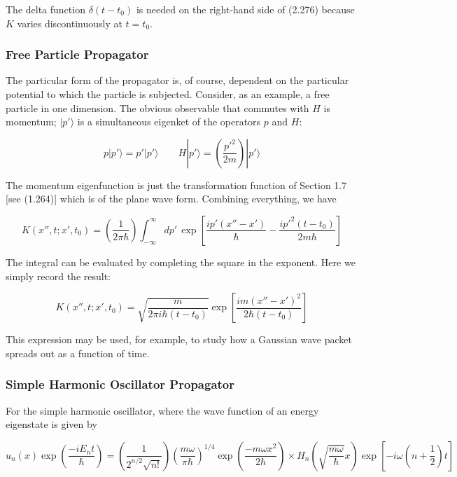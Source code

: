\documentclass[11pt,a4paper]{article}
\begin{document}
The delta function $\delta(t - t_0)$ is needed on the right-hand side of (2.276) because $K$ varies discontinuously at $t = t_0$.

\subsubsection{Free Particle Propagator}

The particular form of the propagator is, of course, dependent on the particular potential to which the particle is subjected. Consider, as an example, a free particle in one dimension. The obvious observable that commutes with $H$ is momentum; $|p'\rangle$ is a simultaneous eigenket of the operators $p$ and $H$:

\begin{equation}
p|p'\rangle = p'|p'\rangle \qquad H|p'\rangle = \left(\frac{p'^2}{2m}\right)|p'\rangle
\tag{2.278}
\end{equation}

The momentum eigenfunction is just the transformation function of Section 1.7 [see (1.264)] which is of the plane wave form. Combining everything, we have

\begin{equation}
K(x'', t; x', t_0) = \left(\frac{1}{2\pi\hbar}\right)\int_{-\infty}^{\infty} dp'\,\exp\left[\frac{ip'(x'' - x')}{\hbar} - \frac{ip'^2(t - t_0)}{2m\hbar}\right]
\tag{2.279}
\end{equation}

The integral can be evaluated by completing the square in the exponent. Here we simply record the result:

\begin{equation}
\boxed{K(x'', t; x', t_0) = \sqrt{\frac{m}{2\pi i\hbar(t - t_0)}}\exp\left[\frac{im(x'' - x')^2}{2\hbar(t - t_0)}\right]}
\tag{2.280}
\end{equation}

This expression may be used, for example, to study how a Gaussian wave packet spreads out as a function of time.

\subsubsection{Simple Harmonic Oscillator Propagator}

For the simple harmonic oscillator, where the wave function of an energy eigenstate is given by

\begin{equation}
u_n(x)\exp\left(\frac{-iE_n t}{\hbar}\right) = \left(\frac{1}{2^{n/2}\sqrt{n!}}\right)\left(\frac{m\omega}{\pi\hbar}\right)^{1/4}\exp\left(\frac{-m\omega x^2}{2\hbar}\right) \times H_n\left(\sqrt{\frac{m\omega}{\hbar}}x\right)\exp\left[-i\omega\left(n + \frac{1}{2}\right)t\right]
\tag{2.281}
\end{equation}
\end{document}
